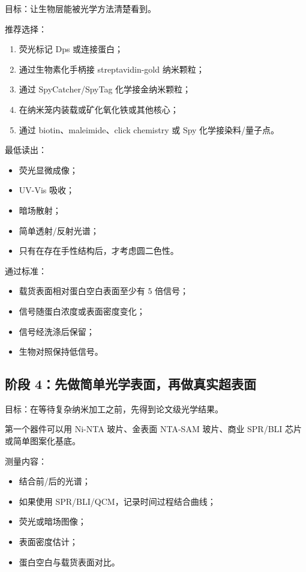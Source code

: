 \documentclass[11pt]{ctexart}
\begin{document}
目标：让生物层能被光学方法清楚看到。

推荐选择：

\begin{enumerate}
\item 荧光标记 Dps 或连接蛋白；
\item 通过生物素化手柄接 streptavidin-gold 纳米颗粒；
\item 通过 SpyCatcher/SpyTag 化学接金纳米颗粒；
\item 在纳米笼内装载或矿化氧化铁或其他核心；
\item 通过 biotin、maleimide、click chemistry 或 Spy 化学接染料/量子点。
\end{enumerate}

最低读出：

\begin{itemize}
\item 荧光显微成像；
\item UV-Vis 吸收；
\item 暗场散射；
\item 简单透射/反射光谱；
\item 只有在存在手性结构后，才考虑圆二色性。
\end{itemize}

通过标准：

\begin{itemize}
\item 载货表面相对蛋白空白表面至少有 5 倍信号；
\item 信号随蛋白浓度或表面密度变化；
\item 信号经洗涤后保留；
\item 生物对照保持低信号。
\end{itemize}

\subsection{阶段 4：先做简单光学表面，再做真实超表面}

目标：在等待复杂纳米加工之前，先得到论文级光学结果。

第一个器件可以用 Ni-NTA 玻片、金表面 NTA-SAM 玻片、商业 SPR/BLI 芯片或简单图案化基底。

测量内容：

\begin{itemize}
\item 结合前/后的光谱；
\item 如果使用 SPR/BLI/QCM，记录时间过程结合曲线；
\item 荧光或暗场图像；
\item 表面密度估计；
\item 蛋白空白与载货表面对比。
\end{itemize}
\end{document}
